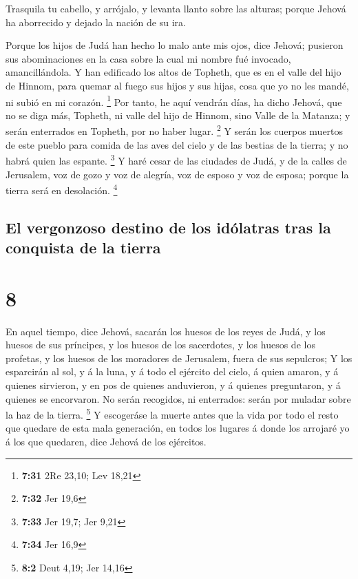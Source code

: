  Trasquila tu cabello, y arrójalo, y levanta llanto sobre
las alturas; porque Jehová ha aborrecido y dejado la nación de su ira.

 Porque los hijos de Judá han hecho lo malo ante mis
ojos, dice Jehová; pusieron sus abominaciones en la casa sobre la cual
mi nombre fué invocado, amancillándola.  Y han edificado
los altos de Topheth, que es en el valle del hijo de Hinnom, para quemar
al fuego sus hijos y sus hijas, cosa que yo no les mandé, ni subió en mi
corazón. \footnote{\textbf{7:31} 2Re 23,10; Lev 18,21} 
Por tanto, he aquí vendrán días, ha dicho Jehová, que no se diga más,
Topheth, ni valle del hijo de Hinnom, sino Valle de la Matanza; y serán
enterrados en Topheth, por no haber lugar. \footnote{\textbf{7:32} Jer
  19,6}  Y serán los cuerpos muertos de este pueblo para
comida de las aves del cielo y de las bestias de la tierra; y no habrá
quien las espante. \footnote{\textbf{7:33} Jer 19,7; Jer 9,21}
 Y haré cesar de las ciudades de Judá, y de la calles de
Jerusalem, voz de gozo y voz de alegría, voz de esposo y voz de esposa;
porque la tierra será en desolación. \footnote{\textbf{7:34} Jer 16,9}

\hypertarget{el-vergonzoso-destino-de-los-iduxf3latras-tras-la-conquista-de-la-tierra}{%
\subsection{El vergonzoso destino de los idólatras tras la conquista de
la
tierra}\label{el-vergonzoso-destino-de-los-iduxf3latras-tras-la-conquista-de-la-tierra}}

\hypertarget{section-7}{%
\section{8}\label{section-7}}

 En aquel tiempo, dice Jehová, sacarán los huesos de los
reyes de Judá, y los huesos de sus príncipes, y los huesos de los
sacerdotes, y los huesos de los profetas, y los huesos de los moradores
de Jerusalem, fuera de sus sepulcros;  Y los esparcirán al
sol, y á la luna, y á todo el ejército del cielo, á quien amaron, y á
quienes sirvieron, y en pos de quienes anduvieron, y á quienes
preguntaron, y á quienes se encorvaron. No serán recogidos, ni
enterrados: serán por muladar sobre la haz de la tierra. \footnote{\textbf{8:2}
  Deut 4,19; Jer 14,16}  Y escogeráse la muerte antes que
la vida por todo el resto que quedare de esta mala generación, en todos
los lugares á donde los arrojaré yo á los que quedaren, dice Jehová de
los ejércitos.

